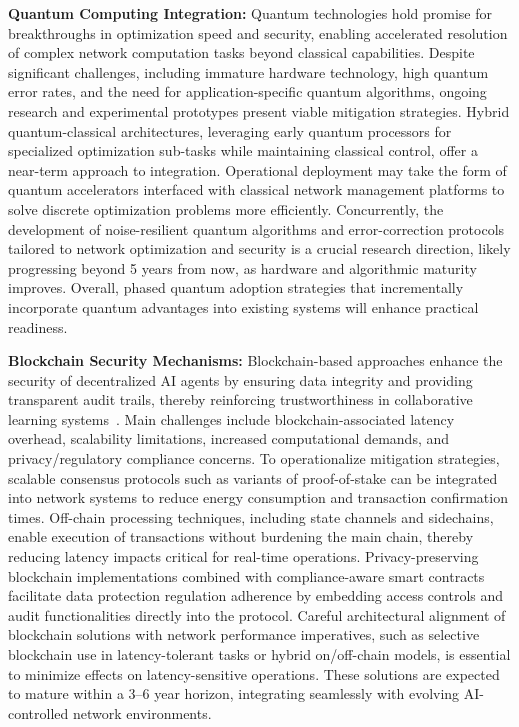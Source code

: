 \documentclass[sigconf]{acmart}
\begin{document}
\textbf{Quantum Computing Integration:} Quantum technologies hold promise for breakthroughs in optimization speed and security, enabling accelerated resolution of complex network computation tasks beyond classical capabilities. Despite significant challenges, including immature hardware technology, high quantum error rates, and the need for application-specific quantum algorithms, ongoing research and experimental prototypes present viable mitigation strategies. Hybrid quantum-classical architectures, leveraging early quantum processors for specialized optimization sub-tasks while maintaining classical control, offer a near-term approach to integration. Operational deployment may take the form of quantum accelerators interfaced with classical network management platforms to solve discrete optimization problems more efficiently. Concurrently, the development of noise-resilient quantum algorithms and error-correction protocols tailored to network optimization and security is a crucial research direction, likely progressing beyond 5 years from now, as hardware and algorithmic maturity improves. Overall, phased quantum adoption strategies that incrementally incorporate quantum advantages into existing systems will enhance practical readiness.

\textbf{Blockchain Security Mechanisms:} Blockchain-based approaches enhance the security of decentralized AI agents by ensuring data integrity and providing transparent audit trails, thereby reinforcing trustworthiness in collaborative learning systems~\cite{ref54}. Main challenges include blockchain-associated latency overhead, scalability limitations, increased computational demands, and privacy/regulatory compliance concerns. To operationalize mitigation strategies, scalable consensus protocols such as variants of proof-of-stake can be integrated into network systems to reduce energy consumption and transaction confirmation times. Off-chain processing techniques, including state channels and sidechains, enable execution of transactions without burdening the main chain, thereby reducing latency impacts critical for real-time operations. Privacy-preserving blockchain implementations combined with compliance-aware smart contracts facilitate data protection regulation adherence by embedding access controls and audit functionalities directly into the protocol. Careful architectural alignment of blockchain solutions with network performance imperatives, such as selective blockchain use in latency-tolerant tasks or hybrid on/off-chain models, is essential to minimize effects on latency-sensitive operations. These solutions are expected to mature within a 3–6 year horizon, integrating seamlessly with evolving AI-controlled network environments.
\end{document}
